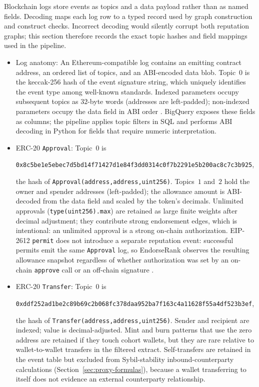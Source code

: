 
Blockchain logs store events as topics and a data payload rather than as named fields. Decoding maps each log row to a typed record used by graph construction and construct checks. Incorrect decoding would silently corrupt both reputation graphs; this section therefore records the exact topic hashes and field mappings used in the pipeline.

\begin{itemize}
\item Log anatomy: An Ethereum-compatible log contains an emitting contract address, an ordered list of topics, and an ABI-encoded data blob. Topic~$0$ is the keccak-256 hash of the event signature string, which uniquely identifies the event type among well-known standards. Indexed parameters occupy subsequent topics as $32$-byte words (addresses are left-padded); non-indexed parameters occupy the data field in ABI order . BigQuery exposes these fields as columns; the pipeline applies topic filters in SQL and performs ABI decoding in Python for fields that require numeric interpretation.

\item ERC-20 \texttt{Approval}: Topic~$0$ is
\begin{center}
\texttt{0x8c5be1e5ebec7d5bd14f71427d1e84f3dd0314c0f7b2291e5b200ac8c7c3b925},
\end{center}
the hash of \texttt{Approval(address,address,uint256)}. Topics~$1$ and~$2$ hold the owner and spender addresses (left-padded); the allowance amount is ABI-decoded from the data field and scaled by the token's decimals. Unlimited approvals (\texttt{type(uint256).max}) are retained as large finite weights after decimal adjustment; they contribute strong endorsement edges, which is intentional: an unlimited approval is a strong on-chain authorization. EIP-2612 \texttt{permit} does not introduce a separate reputation event: successful permits emit the same \texttt{Approval} log, so EndorseRank observes the resulting allowance snapshot regardless of whether authorization was set by an on-chain \texttt{approve} call or an off-chain signature .

\item ERC-20 \texttt{Transfer}: Topic~$0$ is
\begin{center}
\texttt{0xddf252ad1be2c89b69c2b068fc378daa952ba7f163c4a11628f55a4df523b3ef},
\end{center}
the hash of \texttt{Transfer(address,address,uint256)}. Sender and recipient are indexed; value is decimal-adjusted. Mint and burn patterns that use the zero address are retained if they touch cohort wallets, but they are rare relative to wallet-to-wallet transfers in the filtered extract. Self-transfers are retained in the event table but excluded from Sybil-stability inbound-counterparty calculations (Section~\ref{sec:proxy-formulas}), because a wallet transferring to itself does not evidence an external counterparty relationship.


\end{itemize}
